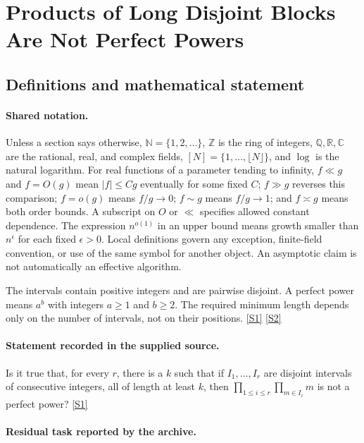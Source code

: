 \documentclass[11pt,a4paper]{article}
\newcommand{\N}{\mathbb{N}}
\newcommand{\Z}{\mathbb{Z}}
\newcommand{\Q}{\mathbb{Q}}
\newcommand{\R}{\mathbb{R}}
\newcommand{\C}{\mathbb{C}}
\newcommand{\sref}[2]{\hyperlink{source:#1:#2}{[S#2]}}
\begin{document}
\section{Products of Long Disjoint Blocks Are Not Perfect Powers}\label{statement}


\subsection{Definitions and mathematical statement}

\paragraph{Shared notation.}Unless a section says otherwise, $\N=\{1,2,\ldots\}$,
$\Z$ is the ring of integers, $\Q,\R,\C$ are the rational, real, and complex
fields, $[N]=\{1,\ldots,\lfloor N\rfloor\}$, and $\log$ is the natural
logarithm. For real functions of a parameter tending to infinity,
$f\ll g$ and $f=O(g)$ mean $|f|\leq Cg$ eventually for some fixed $C$;
$f\gg g$ reverses this comparison; $f=o(g)$ means $f/g\to0$;
$f\sim g$ means $f/g\to1$; and $f\asymp g$ means both order bounds.
A subscript on $O$ or $\ll$ specifies allowed constant dependence.
The expression $n^{o(1)}$ in an upper bound means growth smaller than
$n^\epsilon$ for each fixed $\epsilon>0$. Local definitions govern any
exception, finite-field convention, or use of the same symbol for another
object. An asymptotic claim is not automatically an effective algorithm.



The intervals contain positive integers and are pairwise disjoint. A perfect power means $a^b$ with integers $a\geq1$ and $b\geq2$. The required minimum length depends only on the number of intervals, not on their positions. \sref{statement}{1} \sref{statement}{2}

\paragraph{Statement recorded in the supplied source.}
Is it true that, for every $r$, there is a $k$ such that if $I_1,\ldots,I_r$ are disjoint intervals of consecutive integers, all of length at least $k$, then $ \prod_{1\leq i\leq r}\prod_{m\in I_i}m $ is not a perfect power? \sref{statement}{1}

\paragraph{Residual task reported by the archive.}
\end{document}
